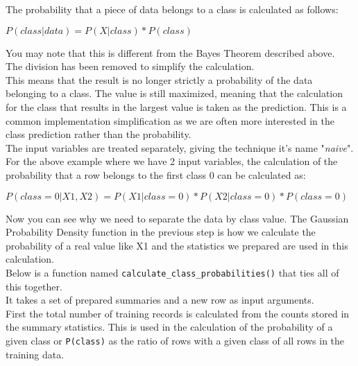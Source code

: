 \documentclass[12pt]{article}
\begin{document}
The probability that a piece of data belongs to a class is calculated as follows:\\

\begin{center}
	$ P(class|data) = P(X|class) * P(class) $
\end{center}

You may note that this is different from the Bayes Theorem described above.\\

The division has been removed to simplify the calculation.\\

This means that the result is no longer strictly a probability of the data belonging to a class. The value is still maximized, meaning that the calculation for the class that results in the largest value is taken as the prediction. This is a common implementation simplification as we are often more interested in the class prediction rather than the probability.\\

The input variables are treated separately, giving the technique it's name "\textit{naive}". For the above example where we have 2 input variables, the calculation of the probability that a row belongs to the first class 0 can be calculated as:\\

\begin{center}
	$ P(class=0|X1,X2) = P(X1|class=0) * P(X2|class=0) * P(class=0) $
\end{center}

Now you can see why we need to separate the data by class value. The Gaussian Probability Density function in the previous step is how we calculate the probability of a real value like X1 and the statistics we prepared are used in this calculation.\\

Below is a function named \verb|calculate_class_probabilities()| that ties all of this together.\\

It takes a set of prepared summaries and a new row as input arguments.\\

First the total number of training records is calculated from the counts stored in the summary statistics. This is used in the calculation of the probability of a given class or \verb|P(class)| as the ratio of rows with a given class of all rows in the training data.\\
\end{document}
